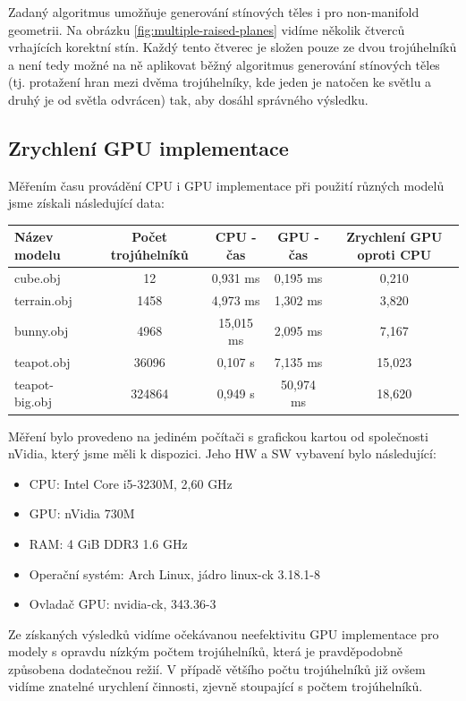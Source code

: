 \documentclass[11pt,a4paper]{article}
\begin{document}
Zadaný algoritmus umožňuje generování stínových těles i pro non-manifold geometrii. Na obrázku \ref{fig:multiple-raised-planes} vidíme několik čtverců vrhajících korektní stín. Každý tento čtverec je složen pouze ze dvou trojúhelníků a není tedy možné na ně aplikovat běžný algoritmus generování stínových těles (tj. protažení hran mezi dvěma trojúhelníky, kde jeden je natočen ke světlu a druhý je od světla odvrácen) tak, aby dosáhl správného výsledku.

\subsection{Zrychlení GPU implementace}

Měřením času provádění CPU i GPU implementace při použití různých modelů jsme získali následující data:

\vspace{0.5cm}
\begin{tabular}{l|c|c|c|c}
	Název modelu   & Počet trojúhelníků  & CPU - čas  & GPU - čas & Zrychlení GPU oproti CPU \\
	\hline
	cube.obj       & 12      & 0,931 ms   & 0,195 ms  & 0,210 \\
	terrain.obj    & 1458    & 4,973 ms   & 1,302 ms  & 3,820 \\ 
	bunny.obj      & 4968    & 15,015 ms  & 2,095 ms  & 7,167 \\
	teapot.obj     & 36096   & 0,107 s    & 7,135 ms  & 15,023 \\
	teapot-big.obj & 324864  & 0,949 s    & 50,974 ms & 18,620 \\
\end{tabular}
\vspace{0.5cm}

Měření bylo provedeno na jediném počítači s grafickou kartou od společnosti nVidia, který jsme měli k dispozici. Jeho HW a SW vybavení bylo následující:
\begin{itemize}
	\item CPU: Intel Core i5-3230M, 2,60 GHz
	\item GPU: nVidia 730M
	\item RAM: 4 GiB DDR3 1.6 GHz
	\item Operační systém: Arch Linux, jádro linux-ck 3.18.1-8
	\item Ovladač GPU: nvidia-ck, 343.36-3
\end{itemize}

Ze získaných výsledků vidíme očekávanou neefektivitu GPU implementace pro modely s opravdu nízkým počtem trojúhelníků, která je pravděpodobně způsobena dodatečnou režií. V případě většího počtu trojúhelníků již ovšem vidíme znatelné urychlení činnosti, zjevně stoupající s počtem trojúhelníků.
\end{document}

